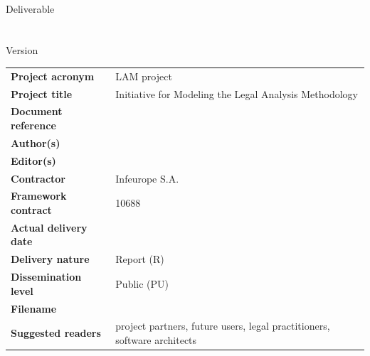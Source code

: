\begin{titlepage}
\begin{center}
  \begin{spacing}{2.5}
    \textbf{\Huge \DelTitle}\\ \vspace{2cm}
    {\large Deliverable \DelNumber} \\ %
	{\large \DelAuthor} \\ %
	{\large \DelDate} \\ %
    {\large Version \DelVersion}
  \end{spacing}
  
  \vspace*{\fill}


\end{center}
\end{titlepage}

\clearpage


\setlength{\headheight}{1cm}
\setlength{\footskip}{18mm}
\addtolength{\textheight}{-\footskip}
\pagestyle{empty}

\clearpage



\vspace{6cm}

\begin{flushleft}
\begin{table}[!b]
\begin{tabular}{p{4.5cm}p{\textwidth-5cm}}
	\textbf{Project acronym}       &   LAM project\\
	\textbf{Project title}    &   Initiative for Modeling the Legal Analysis Methodology  \\ 
	\textbf{Document reference} 	&   \DelTitle \\	
	\textbf{Author(s)}             &   \DelAuthor \\
	\textbf{Editor(s)}             &   \DelAuthor \\
	\textbf{Contractor}    &   Infeurope S.A. \\
	\textbf{Framework contract}    &   10688 \\		
	\textbf{Actual delivery date}  &   \DelDate \\    
	\textbf{Delivery nature}     	&   Report (R) \\
	\textbf{Dissemination level} 	&   Public (PU) \\
	\textbf{Filename}           	&   \DelFilename\\
	\textbf{Suggested readers}    	&   project partners, future users, legal practitioners, software architects\\
\end{tabular}
\end{table}
\end{flushleft}



\clearpage

\clearpage





